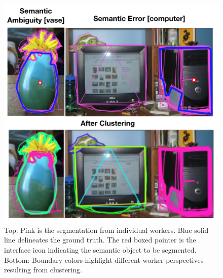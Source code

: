 \begin{figure}[h!]
    \centering
	\vspace{-20pt}
    \includegraphics[width=\textwidth]{plots/semantic_error_clust.png}
    \caption{Top: Pink is the segmentation from individual workers. Blue solid line delineates the ground truth. The red boxed pointer is the interface icon indicating the semantic object to be segmented. Bottom: Boundary colors highlight different worker perspectives resulting from clustering.}
    \label{error_examples}
\end{figure}
\vspace{-10pt}
